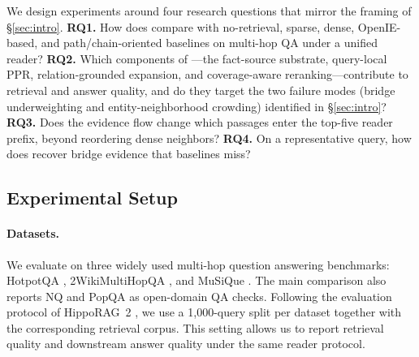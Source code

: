 We design experiments around four research questions that mirror the
framing of \S\ref{sec:intro}. \textbf{RQ1.} How does \methodname{}
compare with no-retrieval, sparse, dense, OpenIE-based, and
path/chain-oriented baselines on multi-hop QA under a unified reader?
\textbf{RQ2.} Which components of \methodname{}---the fact-source
substrate, query-local PPR, relation-grounded expansion, and
coverage-aware reranking---contribute to retrieval and answer quality,
and do they target the two failure modes (bridge underweighting and
entity-neighborhood crowding) identified in \S\ref{sec:intro}?
\textbf{RQ3.} Does the evidence flow change which passages enter the
top-five reader prefix, beyond reordering dense neighbors? \textbf{RQ4.}
On a representative query, how does \methodname{} recover bridge
evidence that baselines miss?

\subsection{Experimental Setup}
\label{sec:experiments:setup}

\paragraph{Datasets.}
We evaluate on three widely used multi-hop question answering
benchmarks: HotpotQA \citep{yang2018hotpotqa}, 2WikiMultiHopQA
\citep{ho2020constructing}, and MuSiQue \citep{trivedi2022musique}.
The main comparison also reports NQ and PopQA as open-domain QA checks.
Following the evaluation protocol of HippoRAG~2
\citep{gutierrez2025hipporag}, we use a 1{,}000-query split per dataset
together with the corresponding retrieval corpus. This setting allows
us to report retrieval quality and downstream answer quality under the
same reader protocol.

